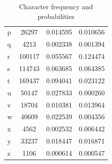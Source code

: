 \documentclass{article}
\theoremstyle{problemstyle}
\begin{document}
\begin{problem}
\begin{enumerate}[a.]
\begin{table}[H]
\begin{tabular}{|l|c|c|c|}
			      p             & 26297          & 0.014595           & 0.010656               \\
			      q             & 4213           & 0.002338           & 0.001394               \\
			      r             & 100117         & 0.055567           & 0.124474               \\
			      s             & 114743         & 0.063685           & 0.064385               \\
			      t             & 169437         & 0.094041           & 0.023122               \\
			      u             & 50147          & 0.027833           & 0.000260               \\
			      v             & 18704          & 0.010381           & 0.013964               \\
			      w             & 40609          & 0.022539           & 0.004356               \\
			      x             & 4562           & 0.002532           & 0.006442               \\
			      y             & 33237          & 0.018447           & 0.016871               \\
			      z             & 1106           & 0.000614           & 0.000547               \\
			      \hline
		      \end{tabular}
		      \caption{Character frequency and probabilities}
		      \label{table:char_data}
	      \end{table}
\end{enumerate}


\end{problem}



\end{document}
